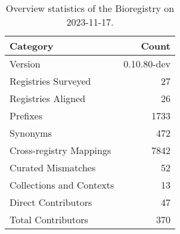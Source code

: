 \begin{table}
\caption{Overview statistics of the Bioregistry on 2023-11-17.}
\label{tab:bioregistry-summary}
\begin{tabular}{lr}
\toprule
Category & Count \\
\midrule
Version & 0.10.80-dev \\
Registries Surveyed & 27 \\
Registries Aligned & 26 \\
Prefixes & 1733 \\
Synonyms & 472 \\
Cross-registry Mappings & 7842 \\
Curated Mismatches & 52 \\
Collections and Contexts & 13 \\
Direct Contributors & 47 \\
Total Contributors & 370 \\
\bottomrule
\end{tabular}
\end{table}
